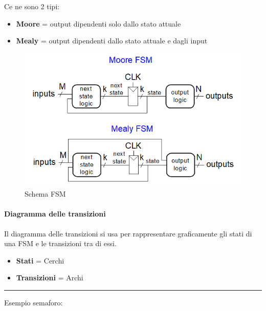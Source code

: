 \documentclass{article}
\begin{document}
\vspace{5pt}

Ce ne sono 2 tipi:
\begin{itemize}
    \item \textbf{Moore} = output dipendenti solo dallo stato attuale
    \item \textbf{Mealy} = output dipendenti dallo stato attuale e dagli input
\end{itemize}

\begin{figure}[ht]
    \centering
    \includegraphics[width=\linewidth]{fsm.png}
    \caption{Schema FSM}
    \label{fig:fsm}
\end{figure}

\paragraph{Diagramma delle transizioni}

Il diagramma delle transizioni si usa per rappresentare graficamente gli stati di una FSM e le transizioni tra di essi.

\begin{itemize}
    \item \textbf{Stati} = Cerchi
    \item \textbf{Transizioni} = Archi
\end{itemize}

\newpage

\noindent\rule{\textwidth}{0.5pt}

Esempio semaforo:
\end{document}
